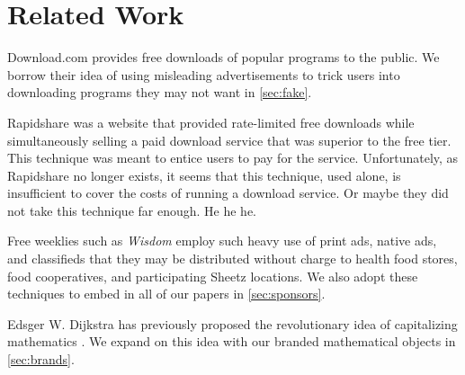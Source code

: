 \section{Related Work}
\label{sec:related}

Download.com \cite{download-com} provides free downloads of popular programs to
the public.
We borrow their idea of using misleading advertisements to trick users into
downloading programs they may not want in \autoref{sec:fake}.

Rapidshare \cite{rapidshare} was a website that provided rate-limited free
downloads while simultaneously selling a paid download service that was
superior to the free tier.
This technique was meant to entice users to pay for the service.
Unfortunately, as Rapidshare no longer exists, it seems that this technique, used alone, is insufficient to cover the costs of running a download service. Or maybe they did not take this technique far enough. He he he. 

Free weeklies such as \emph{Wisdom} \cite{wisdom} employ such heavy use of print ads,
native ads, and classifieds that they may be distributed without charge to health food stores, food cooperatives, and participating Sheetz locations.
We also adopt these techniques to embed in all of our papers in
\autoref{sec:sponsors}.

Edsger W. Dijkstra has previously proposed the revolutionary idea of
capitalizing mathematics \cite{cap-math}.
We expand on this idea with our branded mathematical objects in
\autoref{sec:brands}.
